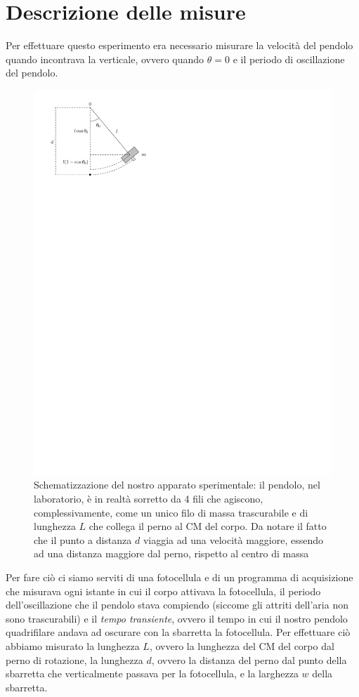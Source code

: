 \documentclass{article}
\begin{document}
	\section{Descrizione delle misure}
	Per effettuare questo esperimento era necessario misurare la velocità del pendolo quando incontrava la verticale, ovvero quando $\theta = 0$ e il periodo di oscillazione del pendolo. 
	\begin{figure}[htbp]
		\centering
  		\includegraphics[scale=0.80]{pendolo_fisico_2.pdf}
  		\caption{Schematizzazione del nostro apparato sperimentale: il pendolo, nel laboratorio, è in realtà sorretto da 4 fili che agiscono, complessivamente, come un unico filo di massa trascurabile e di lunghezza $L$ che collega il perno al CM del corpo. Da notare il fatto che il punto a distanza $d$ viaggia ad una velocità maggiore, essendo ad una distanza maggiore dal perno, rispetto al centro di massa}
  		\label{fig:pendolo}
	\end{figure}	
	Per fare ciò ci siamo serviti di una fotocellula e di un programma di acquisizione che misurava ogni istante in cui il corpo attivava la fotocellula, il periodo dell'oscillazione che il pendolo stava compiendo (siccome gli attriti dell'aria non sono trascurabili) e il \emph{tempo transiente}, ovvero il tempo in cui il nostro pendolo quadrifilare andava ad oscurare con la sbarretta la fotocellula. Per effettuare ciò abbiamo misurato la lunghezza $L$, ovvero la lunghezza del CM del corpo dal perno di rotazione, la lunghezza $d$, ovvero la distanza del perno dal punto della sbarretta che verticalmente passava per la fotocellula, e la larghezza $w$ della sbarretta.
\end{document}
